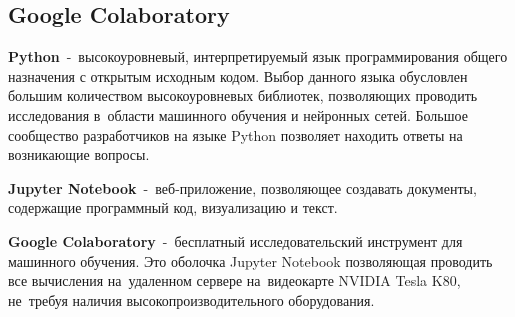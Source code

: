 \subsection{Google Colaboratory}

\textbf{Python}\cite{bib:python}~-~высокоуровневый, интерпретируемый язык программирования общего назначения с открытым исходным кодом.
Выбор данного языка обусловлен большим количеством высокоуровневых библиотек, позволяющих проводить исследования в~области машинного обучения и нейронных сетей.
Большое сообщество разработчиков на языке Python позволяет находить ответы на возникающие вопросы\cite{bib:why_python}.

\textbf{Jupyter Notebook}\cite{bib:jupyter}~-~веб-приложение, позволяющее создавать документы, содержащие программный код, визуализацию и текст.

\textbf{Google Colaboratory}\cite{bib:google_colab}\cite{bib:colab_settings}~-~бесплатный исследовательский инструмент для машинного обучения.
Это оболочка Jupyter Notebook позволяющая проводить все вычисления на~удаленном сервере на~видеокарте NVIDIA Tesla K80\cite{bib:nvidia_k80}, не~требуя наличия высокопроизводительного оборудования.

\newpage

